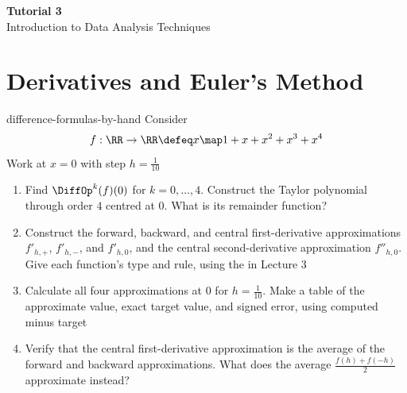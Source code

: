 \documentclass[12pt]{article}
\begin{document}
\begin{center}
  {\LARGE\bfseries Tutorial 3}\\[0.25em]
  {\large Introduction to Data Analysis Techniques}\\[0.15em]
\end{center}

\section{Derivatives and Euler's Method}

\begin{eg}{difference-formulas-by-hand}
  Consider
  \[
    f:\RR\to\RR\defeq x\map 1+x+x^2+x^3+x^4
  \]
  Work at $x=0$ with step $h=\frac1{10}$
  \begin{enumerate}
    \item Find $\DiffOp^k(f)(0)$ for $k=0,\ldots,4$. Construct the
      Taylor polynomial through order $4$ centred at $0$.
      What is its remainder function?
    \item Construct the forward, backward, and central first-derivative
      approximations $f'_{h,+}$, $f'_{h,-}$, and $f'_{h,0}$, and the
      central second-derivative approximation $f''_{h,0}$.
      Give each function's type and rule, using the
      in Lecture 3
    \item Calculate all four approximations at $0$ for $h=\frac1{10}$.
      Make a table of the approximate value, exact target value, and
      signed error, using computed minus target
    \item Verify that the central first-derivative approximation is
      the average of the forward and backward approximations.
      What does the average $\frac{f(h)+f(-h)}2$ approximate instead?
  \end{enumerate}

\end{eg}

\newpage
\end{document}
